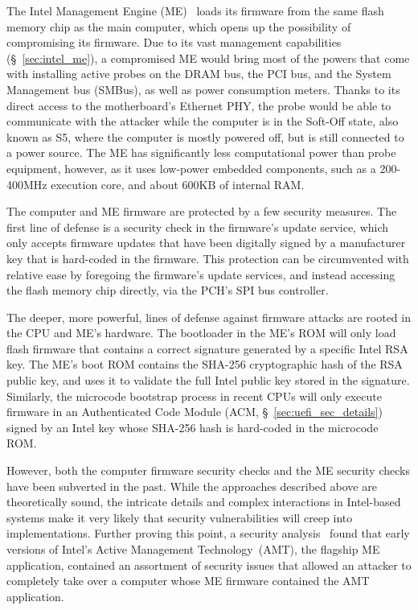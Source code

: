 The Intel Management Engine (ME)~\cite{ruan2014intelme} loads its firmware
from the same flash memory chip as the main computer, which opens up the
possibility of compromising its firmware. Due to its vast management
capabilities (\S~\ref{sec:intel_me}), a compromised ME would bring most of the
powers that come with installing active probes on the DRAM bus, the PCI bus,
and the System Management bus (SMBus), as well as power consumption meters.
Thanks to its direct access to the motherboard's Ethernet PHY, the probe would
be able to communicate with the attacker while the computer is in the Soft-Off
state, also known as S5, where the computer is mostly powered off, but is still
connected to a power source.  The ME has significantly less computational power
than probe equipment, however, as it uses low-power embedded components, such
as a 200-400MHz execution core, and about 600KB of internal RAM.

The computer and ME firmware are protected by a few security measures. The
first line of defense is a security check in the firmware's update service,
which only accepts firmware updates that have been digitally signed by a
manufacturer key that is hard-coded in the firmware. This protection can be
circumvented with relative ease by foregoing the firmware's update services,
and instead accessing the flash memory chip directly, via the PCH's SPI bus
controller.

The deeper, more powerful, lines of defense against firmware attacks are rooted
in the CPU and ME's hardware. The bootloader in the ME's ROM will only load
flash firmware that contains a correct signature generated by a specific Intel
RSA key. The ME's boot ROM contains the SHA-256 cryptographic hash of the RSA
public key, and uses it to validate the full Intel public key stored in the
signature. Similarly, the microcode bootstrap process in recent CPUs will only
execute firmware in an Authenticated Code Module
(ACM, \S~\ref{sec:uefi_sec_details}) signed by an Intel key whose SHA-256 hash
is hard-coded in the microcode ROM.

However, both the computer firmware security checks \cite{wojtczuk2010bios,
furtak2014bios} and the ME security checks \cite{tereshkin2009amt} have been
subverted in the past. While the approaches described above are theoretically
sound, the intricate details and complex interactions in Intel-based systems
make it very likely that security vulnerabilities will creep into
implementations. Further proving this point, a security
analysis~\cite{ververis2010security} found that early versions of Intel's
Active Management Technology~(AMT), the flagship ME application, contained an
assortment of security issues that allowed an attacker to completely take over
a computer whose ME firmware contained the AMT application.


